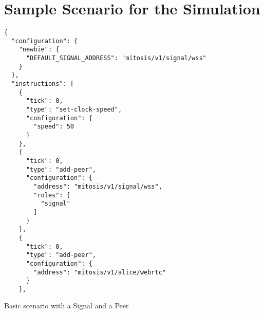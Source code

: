 \section{Sample Scenario for the Simulation}
\begin{Listing}[H]
\begin{lstlisting}
{
  "configuration": {
    "newbie": {
      "DEFAULT_SIGNAL_ADDRESS": "mitosis/v1/signal/wss"
    }
  },
  "instructions": [
    {
      "tick": 0,
      "type": "set-clock-speed",
      "configuration": {
        "speed": 50
      }
    },
    {
      "tick": 0,
      "type": "add-peer",
      "configuration": {
        "address": "mitosis/v1/signal/wss",
        "roles": [
          "signal"
        ]
      }
    },
    {
      "tick": 0,
      "type": "add-peer",
      "configuration": {
        "address": "mitosis/v1/alice/webrtc"
      }
    },
\end{lstlisting}
\caption{Basic scenario with a Signal and a Peer}
\label{lst:anl-scenario}
\end{Listing}